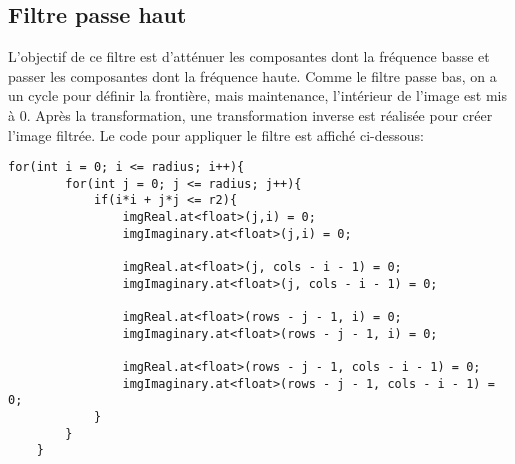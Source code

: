 \documentclass[paper=a4, fontsize=11pt]{scrartcl}	%
\begin{document}
\subsection{Filtre passe haut}
L'objectif de ce filtre est d'atténuer les composantes dont la fréquence basse et passer les composantes dont la fréquence haute. Comme le filtre passe bas, on a un cycle pour définir la frontière, mais maintenance, l'intérieur de l'image est mis à 0. Après la transformation, une transformation inverse est réalisée pour créer l'image filtrée. Le code pour appliquer le filtre est affiché ci-dessous:
\begin{lstlisting}[label=high pass,caption=Le filtre passe haut]
    for(int i = 0; i <= radius; i++){
        for(int j = 0; j <= radius; j++){
            if(i*i + j*j <= r2){
                imgReal.at<float>(j,i) = 0;
                imgImaginary.at<float>(j,i) = 0;

                imgReal.at<float>(j, cols - i - 1) = 0;
                imgImaginary.at<float>(j, cols - i - 1) = 0;

                imgReal.at<float>(rows - j - 1, i) = 0;
                imgImaginary.at<float>(rows - j - 1, i) = 0;

                imgReal.at<float>(rows - j - 1, cols - i - 1) = 0;
                imgImaginary.at<float>(rows - j - 1, cols - i - 1) = 0;
            }   
        }   
    }   
\end{lstlisting}
\end{document}
